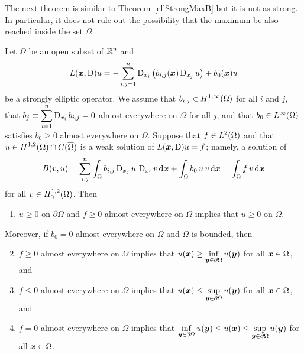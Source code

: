 The next theorem is similar to Theorem~\ref{ellStrongMaxB} but it is
not as strong.  In particular, it does not rule out the possibility
that the maximum be also reached inside the set $\Omega$.

\begin{theorem}
Let $\Omega$ be an open subset of $\displaystyle \mathbb{R}^n$ and
\[
L({\bm{x}},\operatorname{D})u = - \sum_{i,j=1}^n
\operatorname{D}_{x_i} \left( b_{i,j}({\bm{x}}) \operatorname{D}_{x_j} u \right)
+ b_0({\bm{x}}) u
\]
be a strongly elliptic operator.  We assume that
$\displaystyle b_{i,j} \in H^{1,\infty}(\Omega)$ for all $i$ and $j$,
that $\displaystyle b_j \equiv \sum_{i=1}^n \operatorname{D}_{x_i} b_{i,j} = 0$
almost everywhere on $\Omega$ for all $j$, and that
$\displaystyle b_0 \in L^\infty(\Omega)$
satisfies $b_0 \geq 0$ almost everywhere on $\Omega$.  Suppose that
$\displaystyle f\in L^2(\Omega)$ and that
$\displaystyle u\in H^{1,2}(\Omega)\cap C(\overline{\Omega})$ is a
weak solution of $L({\bm{x}},\operatorname{D})u=f$; namely, a solution of
\begin{equation} \label{ell_max_eq3}
B(v,u) = \sum_{i,j}^n
\int_\Omega b_{i,j} \operatorname{D}_{x_j} u \, \operatorname{D}_{x_i} v \,\mathrm{d}{{\bm{x}}} 
+ \int_\Omega b_0\, u \, v \,\mathrm{d}{{\bm{x}}} = \int_\Omega f\,v \,\mathrm{d}{{\bm{x}}}
\end{equation}
for all $\displaystyle v \in H^{1,2}_0(\Omega)$.  Then
\begin{enumerate}
\item $u\geq 0$ on $\partial \Omega$ and $f\geq 0$ almost everywhere on
$\Omega$ implies that $u\geq 0$ on $\Omega$.
\end{enumerate}
Moreover, if $b_0 = 0$ almost everywhere on $\Omega$ and $\Omega$ is
bounded, then
\begin{enumerate}
\setcounter{enumi}{1}
\item $f\geq 0$ almost everywhere on $\Omega$ implies that
$\displaystyle u({\bm{x}}) \geq \inf_{{\bm{y}}\in \partial \Omega} u({\bm{y}})$
for all ${\bm{x}} \in \Omega$, and
\item $f\leq 0$ almost everywhere on $\Omega$ implies that
$\displaystyle u({\bm{x}}) \leq \sup_{{\bm{y}}\in \partial \Omega} u({\bm{y}})$
for all ${\bm{x}} \in \Omega$, and
\item $f= 0$ almost everywhere on $\Omega$ implies that
$\displaystyle \inf_{{\bm{y}}\in \partial \Omega} u({\bm{y}}) \leq u({\bm{x}}) \leq
\sup_{{\bm{y}}\in \partial \Omega} u({\bm{y}})$ for all ${\bm{x}} \in
\Omega$.
\end{enumerate}
\end{theorem}

